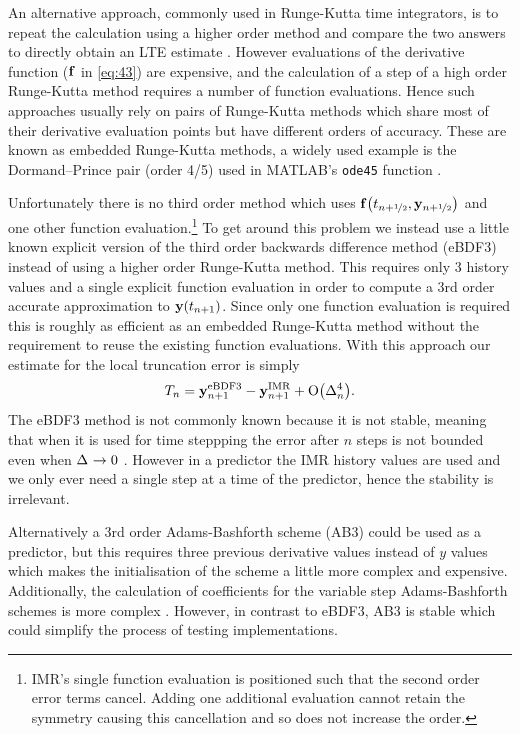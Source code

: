 An alternative approach, commonly used in Runge-Kutta time integrators, is to repeat the calculation using a higher order method and compare the two answers to directly obtain an LTE estimate \cite[165]{HairerWanner}.
However evaluations of the derivative function (${\mathbf{f}}$ in \cref{eq:43}) are expensive, and the calculation of a step of a high order Runge-Kutta method requires a number of function evaluations.
Hence such approaches usually rely on pairs of Runge-Kutta methods which share most of their derivative evaluation points but have different orders of accuracy.
These are known as embedded Runge-Kutta methods, a widely used example is the Dormand–Prince pair (order 4/5) used in MATLAB's \texttt{ode45} function \cite{matlab-ode45}.

Unfortunately there is no third order method which uses ${\mathbf{f}{\left( t_{n+\nicefrac{1}{2}}, \mathbf{y}_{n+\nicefrac{1}{2}} \right)}}$ and one other function evaluation.\footnote{IMR's single function evaluation is positioned such that the second order error terms cancel. Adding one additional evaluation cannot retain the symmetry causing this cancellation and so does not increase the order.}
To get around this problem we instead use a little known explicit version of the third order backwards difference method (eBDF3) instead of using a higher order Runge-Kutta method.
This requires only 3 history values and a single explicit function evaluation in order to compute a 3rd order accurate approximation to $\mathbf{y}(t_{n+1})$.
Since only one function evaluation is required this is roughly as efficient as an embedded Runge-Kutta method without the requirement to reuse the existing function evaluations.
With this approach our estimate for the local truncation error is simply
\begin{equation}
  \label{eq:aimr-lte-est}
  T_n = \mathbf{y}_{n+1}^{\text{eBDF3}} - \mathbf{y}_{n+1}^{\text{IMR}} + \text{O}{\left( \Delta_{n}^4 \right)}.
\end{equation}
The eBDF3 method is not commonly known because it is not stable, meaning that when it is used for time steppping the error after $n$ steps is not bounded even when $\Delta_{} \rightarrow 0$ \cite[365]{HairerNorsettWanner}.
However in a predictor the IMR history values are used and we only ever need a single step at a time of the predictor, hence the stability is irrelevant.

Alternatively a 3rd order Adams-Bashforth scheme (AB3) could be used as a predictor, but this requires three previous derivative values instead of $y$ values which makes the initialisation of the scheme a little more complex and expensive.
Additionally, the calculation of coefficients for the variable step Adams-Bashforth schemes is more complex \cite[400]{HairerNorsettWanner}.
However, in contrast to eBDF3, AB3 is stable which could simplify the process of testing implementations.


